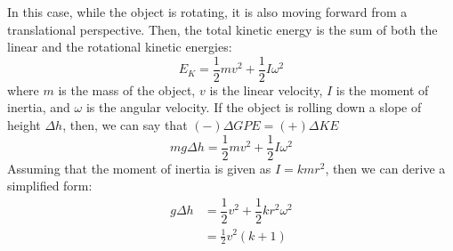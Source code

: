 \documentclass[a4paper,12pt]{article}
\begin{document}
In this case, while the object is rotating, it is also moving forward from a translational perspective. Then, the total kinetic energy is the sum of both the linear and the rotational kinetic energies: $$E_K = \dfrac{1}{2}mv^2 + \dfrac{1}{2}I\omega^2$$where $m$ is the mass of the object, $v$ is the linear velocity, $I$ is the moment of inertia, and $\omega$ is the angular velocity.
If the object is rolling down a slope of height $\Delta h$, then, we can say that $(-)\Delta GPE = (+)\Delta KE$
$$mg\Delta h = \dfrac{1}{2}mv^2 + \dfrac{1}{2}I\omega^2$$
Assuming that the moment of inertia is given as $I = kmr^2$, then we can derive a simplified form:
\begin{align*}
  g\Delta h & = \dfrac{1}{2}v^2 + \dfrac{1}{2}kr^2\omega^2 \\
            & = \frac{1}{2}v^2(k + 1)
\end{align*}
\end{document}
